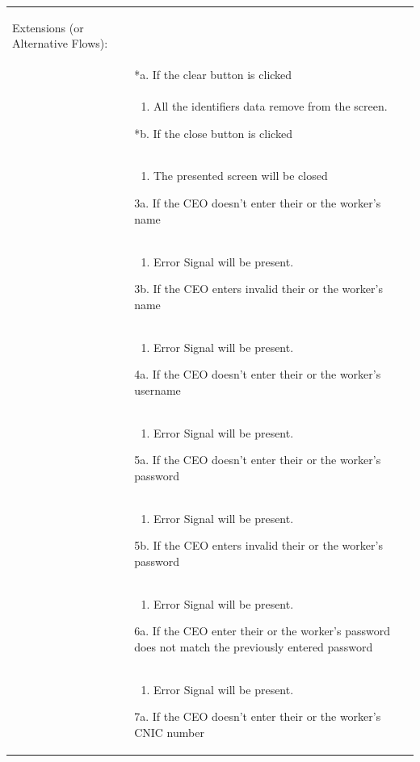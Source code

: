 \documentclass[12pt,a4paper]{article}
\begin{document}
\begin{longtable}{| p{3cm}|p{12cm}|}
\begin{enumerate}
\end{enumerate}
Extensions (or Alternative Flows):\\
& *a. If the clear button is clicked \\
& \begin{enumerate}
		\item All the identifiers data remove from the screen.
	\end{enumerate}
*b. If the close button is clicked\\
&	\begin{enumerate}
		\item The presented screen will be closed
	\end{enumerate}
3a. If the CEO doesn't enter their or the worker's name \\ 	
&	\begin{enumerate}
		\item Error Signal will be present.
	\end{enumerate}
3b. If the CEO enters invalid their or the worker's name \\ 	
&	\begin{enumerate}
		\item Error Signal will be present.
	\end{enumerate}
4a. If the CEO doesn't enter their or the worker's username\\ 	
&	\begin{enumerate}
		\item Error Signal will be present.
	\end{enumerate}
5a. If the CEO doesn't enter their or the worker's password \\ 	
&	\begin{enumerate}
		\item Error Signal will be present.
	\end{enumerate}
5b. If the CEO enters invalid their or the worker's password \\ 	
&	\begin{enumerate}
		\item Error Signal will be present.
	\end{enumerate}
6a. If the CEO enter their or the worker's password does not match the previously entered password \\ 	
&	\begin{enumerate}
		\item Error Signal will be present.
	\end{enumerate}
7a. If the CEO doesn't enter their or the worker's CNIC number\\ 	

\end{longtable}
\end{document}
